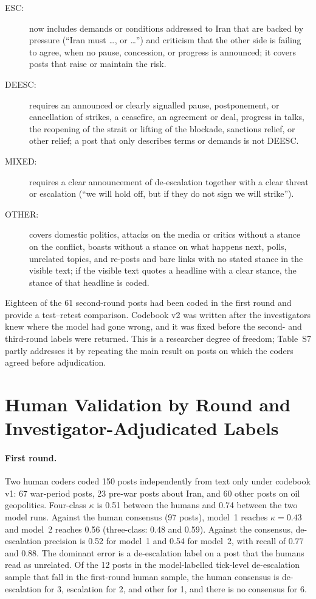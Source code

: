 \documentclass[11pt]{article}
\begin{document}
\begin{description}
\item[ESC:] now includes demands or conditions addressed to Iran that are backed by pressure (``Iran must \ldots, or \ldots'') and criticism that the other side is failing to agree, when no pause, concession, or progress is announced; it covers posts that raise or maintain the risk.
\item[DEESC:] requires an announced or clearly signalled pause, postponement, or cancellation of strikes, a ceasefire, an agreement or deal, progress in talks, the reopening of the strait or lifting of the blockade, sanctions relief, or other relief; a post that only describes terms or demands is not DEESC.
\item[MIXED:] requires a clear announcement of de-escalation together with a clear threat or escalation (``we will hold off, but if they do not sign we will strike'').
\item[OTHER:] covers domestic politics, attacks on the media or critics without a stance on the conflict, boasts without a stance on what happens next, polls, unrelated topics, and re-posts and bare links with no stated stance in the visible text; if the visible text quotes a headline with a clear stance, the stance of that headline is coded.
\end{description}

\noindent Eighteen of the 61 second-round posts had been coded in the first round and provide a test--retest comparison. Codebook v2 was written after the investigators knew where the model had gone wrong, and it was fixed before the second- and third-round labels were returned. This is a researcher degree of freedom; Table~S7 partly addresses it by repeating the main result on posts on which the coders agreed before adjudication.

\section{Human Validation by Round and Investigator-Adjudicated Labels}
\label{sec:validation}

\paragraph{First round.} Two human coders coded 150 posts independently from text only under codebook v1: 67 war-period posts, 23 pre-war posts about Iran, and 60 other posts on oil geopolitics. Four-class $\kappa$ is 0.51 between the humans and 0.74 between the two model runs. Against the human consensus (97 posts), model~1 reaches $\kappa = 0.43$ and model~2 reaches 0.56 (three-class: 0.48 and 0.59). Against the consensus, de-escalation precision is 0.52 for model~1 and 0.54 for model~2, with recall of 0.77 and 0.88. The dominant error is a de-escalation label on a post that the humans read as unrelated. Of the 12 posts in the model-labelled tick-level de-escalation sample that fall in the first-round human sample, the human consensus is de-escalation for 3, escalation for 2, and other for 1, and there is no consensus for 6.
\end{document}
